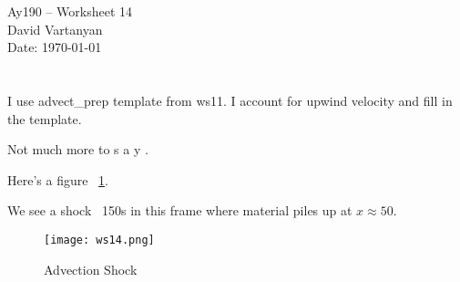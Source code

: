\documentclass[11pt,letterpaper]{article}
\begin{document}
\begin{center}
\Large
Ay190 -- Worksheet 14\\
David Vartanyan\\
Date: \today
\end{center}

\section{}

I use advect\_prep template from ws11. I account for upwind velocity and fill in the template.

Not 
much
more
to
s
a
y
.

Here's a figure ~\ref{fig:1}.

We see a shock ~150s in this frame where material piles up at $x \approx 50$.

\begin{figure}[bth]
\centering
\texttt{[image: ws14.png]}
\caption{Advection Shock}
\label{fig:1}
\end{figure}
\end{document}
